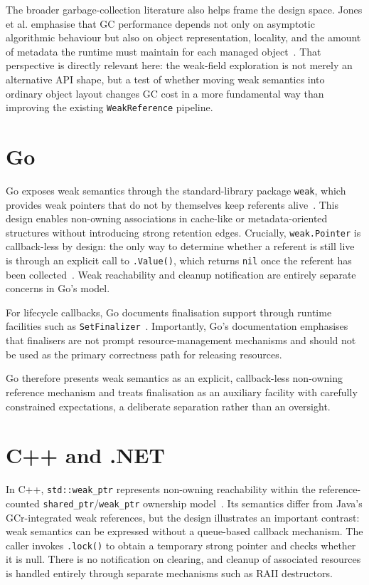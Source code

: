 The broader garbage-collection literature also helps frame the design space. Jones et al. emphasise that \ac{GC} performance depends not only on asymptotic algorithmic behaviour but also on object representation, locality, and the amount of metadata the runtime must maintain for each managed object~\cite{jones11-gc-handbook}. That perspective is directly relevant here: the weak-field exploration is not merely an alternative \ac{API} shape, but a test of whether moving weak semantics into ordinary object layout changes \ac{GC} cost in a more fundamental way than improving the existing \texttt{WeakReference} pipeline.

\section{Go}
\label{sec:rw-go}

Go exposes weak semantics through the standard-library package \texttt{weak}, which provides weak pointers that do not by themselves keep referents alive~\cite{go-weak-pkg}. This design enables non-owning associations in cache-like or metadata-oriented structures without introducing strong retention edges. Crucially, \texttt{weak.Pointer} is callback-less by design: the only way to determine whether a referent is still live is through an explicit call to \texttt{.Value()}, which returns \texttt{nil} once the referent has been collected~\cite{go-weak-pkg}. Weak reachability and cleanup notification are entirely separate concerns in Go's model.

For lifecycle callbacks, Go documents finalisation support through runtime facilities such as \texttt{SetFinalizer}~\cite{go-runtime-setfinalizer}. Importantly, Go's documentation emphasises that finalisers are not prompt resource-management mechanisms and should not be used as the primary correctness path for releasing resources.

Go therefore presents weak semantics as an explicit, callback-less non-owning reference mechanism and treats finalisation as an auxiliary facility with carefully constrained expectations, a deliberate separation rather than an oversight.

\section{C++ and .NET}
\label{sec:rw-cpp-dotnet}

In C++, \texttt{std::weak\_ptr} represents non-owning reachability within the reference-counted \texttt{shared\_ptr}/\texttt{weak\_ptr} ownership model~\cite{cppreference-weak-ptr}. Its semantics differ from Java's \ac{GCr}-integrated weak references, but the design illustrates an important contrast: weak semantics can be expressed without a queue-based callback mechanism. The caller invokes \texttt{.lock()} to obtain a temporary strong pointer and checks whether it is null. There is no notification on clearing, and cleanup of associated resources is handled entirely through separate mechanisms such as \ac{RAII} destructors.

